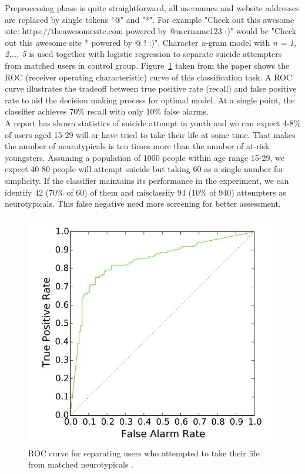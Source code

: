 Preprocessing phase is quite straightforward, all usernames and website addresses are replaced by single tokens "@" and "*". For example "Check out this awesome site: https://theawesomesite.com powered by @username123 :)" would be "Check out this awesome site * powered by @ ! :)". Character \textit{n}-gram model with \textit{n = 1, 2..., 5} is used together with logistic regression to separate suicide attempters from matched users in control group. Figure~\ref{fig:roc_curve} taken from the paper \cite{Coppersmith2016} shows the ROC (receiver operating characteristic) curve of this classification task. A ROC curve illustrates the tradeoff between true positive rate (recall) and false positive rate to aid the decision making process for optimal model. At a single point, the classifier achieves 70\% recall with only 10\% false alarms.\\
A report \cite{Kann2016} has shown statistics of suicide attempt in youth and we can expect 4-8\% of users aged 15-29 will or have tried to take their life at some time. That makes the number of neurotypicals is ten times more than the number of at-risk youngsters. Assuming a population of 1000 people within age range 15-29, we expect 40-80 people will attempt suicide but taking 60 as a single number for simplicity. If the classifier maintains its performance in the experiment, we can identify 42 (70\% of 60) of them and misclassify 94 (10\% of 940) attempters as neurotypicals. This false negative need more screening for better assessment.
\begin{figure}
\centering
\includegraphics[width=\textwidth, clip=true]{img/ROC_curve}
\caption{ROC curve for separating users who attempted to take their life from matched neurotypicals \cite{Coppersmith2016}.} 
\label{fig:roc_curve}
\end{figure}
